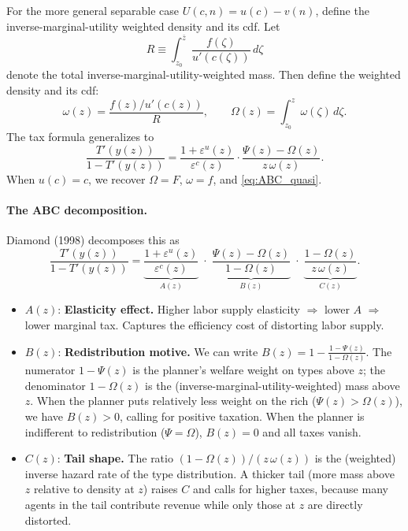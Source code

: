 \documentclass[12pt,a4paper]{article}
\theoremstyle{definition}
\theoremstyle{plain}
\theoremstyle{remark}
\newcommand{\zbar}{\bar{z}}
\newcommand{\zlow}{z_{\scriptscriptstyle 0}}
\begin{document}
For the more general separable case $U(c,n) = u(c) - v(n)$, define the inverse-marginal-utility weighted density and its cdf. Let
\[
  R \equiv \int_{\zlow}^{\zbar} \frac{f(\zeta)}{u'(c(\zeta))} \, d\zeta
\]
denote the total inverse-marginal-utility-weighted mass. Then define the weighted density and its cdf:
\[
  \omega(z) = \frac{f(z) / u'(c(z))}{R}, \qquad
  \Omega(z) = \int_{\zlow}^{z} \omega(\zeta) \, d\zeta.
\]
The tax formula generalizes to
\begin{equation}
\label{eq:ABC_separable}
  \frac{T'(y(z))}{1 - T'(y(z))} = \frac{1+\varepsilon^u(z)}{\varepsilon^c(z)} \cdot \frac{\Psi(z) - \Omega(z)}{z \, \omega(z)}.
\end{equation}
When $u(c) = c$, we recover $\Omega = F$, $\omega = f$, and \eqref{eq:ABC_quasi}.

\paragraph{The ABC decomposition.} Diamond (1998) decomposes this as
\begin{equation}
\label{eq:ABC}
  \frac{T'(y(z))}{1 - T'(y(z))} =
  \underbrace{\frac{1+\varepsilon^u(z)}{\varepsilon^c(z)}}_{A(z)}
  \;\cdot\;
  \underbrace{\frac{\Psi(z) - \Omega(z)}{1 - \Omega(z)}}_{B(z)}
  \;\cdot\;
  \underbrace{\frac{1 - \Omega(z)}{z \, \omega(z)}}_{C(z)}.
\end{equation}
\begin{itemize}[leftmargin=2em]
  \item $A(z)$: \textbf{Elasticity effect.} Higher labor supply elasticity $\Rightarrow$ lower $A$ $\Rightarrow$ lower marginal tax. Captures the efficiency cost of distorting labor supply.

  \item $B(z)$: \textbf{Redistribution motive.} We can write $B(z) = 1 - \frac{1 - \Psi(z)}{1 - \Omega(z)}$. The numerator $1 - \Psi(z)$ is the planner's welfare weight on types above $z$; the denominator $1 - \Omega(z)$ is the (inverse-marginal-utility-weighted) mass above $z$. When the planner puts relatively less weight on the rich ($\Psi(z) > \Omega(z)$), we have $B(z) > 0$, calling for positive taxation. When the planner is indifferent to redistribution ($\Psi = \Omega$), $B(z) = 0$ and all taxes vanish.

  \item $C(z)$: \textbf{Tail shape.} The ratio $(1 - \Omega(z))/(z \, \omega(z))$ is the (weighted) inverse hazard rate of the type distribution. A thicker tail (more mass above $z$ relative to density at $z$) raises $C$ and calls for higher taxes, because many agents in the tail contribute revenue while only those at $z$ are directly distorted.
\end{itemize}
\end{document}
